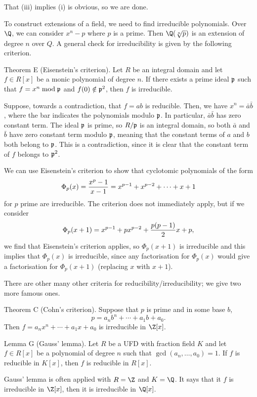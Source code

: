 That (iii) implies (i) is obvious, so we are done.\slug

To construct extensions of a field, we need to find irreducible polynomials. Over $\Q$, we can consider $x^n - p$ where $p$ is a prime. Then $\Q(\root n\of p)$ is an extension of degree $n$ over $Q$. A general check for irreducibility is given by the following criterion.

\parenproclaim Theorem E (Eisenstein's criterion). Let $R$ be an integral domain and let $f\in R[x]$ be a monic polynomial of degree $n$. If there exists a prime ideal $\frak p$ such that $f = x^n \bmod \frak p$ and $f(0) \notin \frak p^2$, then $f$ is irreducible.

\proof Suppose, towards a contradiction, that $f = ab$ is reducible. Then, we have $x^n = \bar a \bar b$, where the bar indicates the polynomials modulo $\frak p$. In particular, $\bar a\bar b$ has zero constant term. The ideal $\frak p$ is prime, so $R/\frak p$ is an integral domain, so both $\bar a$ and $\bar b$ have zero constant term modulo $\frak p$, meaning that the constant terms of $a$ and $b$ both belong to $\frak p$. This is a contradiction, since it is clear that the constant term of $f$ belongs to $\frak p^2$.\slug

We can use Eisenstein's criterion to show that cyclotomic polynomials of the form
$$\Phi_p(x) = {x^p -1\over x-1} = x^{p-1} + x^{p-2} + \cdots + x + 1$$
for $p$ prime are irreducible. The criterion does not immediately apply, but if we consider
$$\Phi_p(x+1) = x^{p-1} + px^{p-2} + {p(p-1)\over 2}x + p,$$
we find that Eisenstein's criterion applies, so $\Phi_p(x+1)$ is irreducible and this implies that $\Phi_p(x)$ is irreducible, since any factorisation for $\Phi_p(x)$ would give a factorisation for $\Phi_p(x+1)$ (replacing $x$ with $x+1$).

There are other many other criteria for reducibility/irreducibility; we give two more famous ones.

\parenproclaim Theorem C (Cohn's criterion). Suppose that $p$ is prime and in some base $b$,
$$p = a_nb^n + \cdots + a_1b + a_0.$$
Then $f = a_nx^n + \cdots + a_1x + a_0$ is irreducible in $\Z[x]$.\slug

\parenproclaim Lemma G (Gauss' lemma). Let $R$ be a UFD with fraction field $K$ and let $f\in R[x]$ be a polynomial of degree $n$ such that $\gcd(a_n, \ldots, a_0) = 1$. If $f$ is reducible in $K[x]$, then $f$ is reducible in $R[x]$.\slug

Gauss' lemma is often applied with $R = \Z$ and $K = \Q$. It says that it $f$ is irreducible in $\Z[x]$, then it is irreducible in $\Q[x]$.

